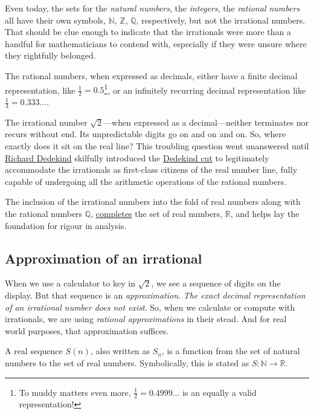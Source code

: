 \documentclass[
  a4paper,
]{article}
\begin{document}
Even today, the sets for the \emph{natural numbers}, the
\emph{integers}, the \emph{rational numbers} all have their own symbols,
\(\mathbb{N}\), \(\mathbb{Z}\), \(\mathbb{Q}\), respectively, but not
the irrational numbers. That should be clue enough to indicate that the
irrationals were more than a handful for mathematicians to contend with,
especially if they were unsure where they rightfully belonged.

The rational numbers, when expressed as decimals, either have a finite
decimal representation, like \(\frac{1}{2} = 0.5\)\footnote{To muddy
  matters even more, \(\frac{1}{2} = 0.4999\dots\) is an equally a valid
  representation!}, or an infinitely recurring decimal representation
like \(\frac{1}{3} = 0.333\dots\).

The irrational number \(\sqrt{2}\)---when expressed as a
decimal---neither terminates nor recurs without end. Its unpredictable
digits go on and on and on. So, where exactly does it sit on the real
line? This troubling question went unanswered until
\href{https://plato.stanford.edu/entries/dedekind-foundations/}{Richard
Dedekind} skilfully introduced the
\href{https://www.britannica.com/science/Dedekind-cut}{Dedekind cut} to
legitimately accommodate the irrationals as first-class citizens of the
real number line, fully capable of undergoing all the arithmetic
operations of the rational numbers.

The inclusion of the irrational numbers into the fold of real numbers
along with the rational numbers \(\mathbb{Q}\),
\href{https://en.wikipedia.org/wiki/Completeness_of_the_real_numbers}{completes}
the set of real numbers, \(\mathbb{R}\), and helps lay the foundation
for rigour in analysis.

\subsection{Approximation of an
irrational}\label{approximation-of-an-irrational}

When we use a calculator to key in \(\sqrt{2}\), we see a sequence of
digits on the display. But that sequence is an \emph{approximation}.
\emph{The exact decimal representation of an irrational number does not
exist}. So, when we calculate or compute with irrationals, we are using
\emph{rational approximations} in their stead. And for real world
purposes, that approximation suffices.

A real sequence \(S(n)\), also written as \(S_{n}\), is a function from
the set of natural numbers to the set of real numbers. Symbolically,
this is stated as \(S: \mathbb{N} \to \mathbb{R}\).
\end{document}
